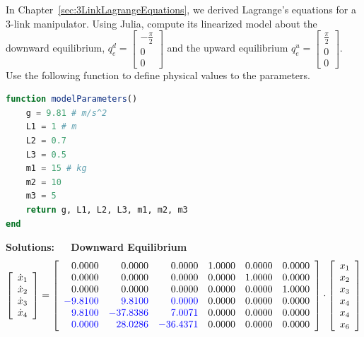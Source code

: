     \bigskip

\begin{example}
\label{ex:linearizedModel3LinkManipulator}
    
    In Chapter~\ref{sec:3LinkLagrangeEquations}, we derived Lagrange's equations for a 3-link manipulator. Using Julia, compute its linearized model about the downward equilibrium, $q_e^{d}=\left[ \begin{array}{c} -\frac{\pi}{2}\\ 0 \\0\end{array} \right]$ and the upward equilibrium $q_e^{u}=\left[ \begin{array}{c} \frac{\pi}{2}\\ 0 \\0\end{array} \right]$. \\

    Use the following function to define physical values to the parameters.
\begin{lstlisting}[language=Julia,style=mystyle]
function modelParameters()
    g = 9.81 # m/s^2
    L1 = 1 # m
    L2 = 0.7
    L3 = 0.5
    m1 = 15 # kg
    m2 = 10
    m3 = 5    
    return g, L1, L2, L3, m1, m2, m3
end
\end{lstlisting}

    \end{example}
    \textbf{Solutions:} ~~ \newline
    \Ans \quad \textbf{Downward Equilibrium}
 $$\left[ \begin{array}{c} \dot{x}_1\\ \dot{x}_2 \\ \dot{x}_3 \\ \dot{x}_4 \end{array} \right]
 = \left[ \begin{array}{rrrrrr}
0.0000 & 0.0000 & 0.0000 & 1.0000 & 0.0000 & 0.0000 \\
0.0000 & 0.0000 & 0.0000 & 0.0000 & 1.0000 & 0.0000 \\
0.0000 & 0.0000 & 0.0000 & 0.0000 & 0.0000 & 1.0000 \\
\color{blue} -9.8100 & \color{blue} 9.8100 & \color{blue} 0.0000 & 0.0000 & 0.0000 & 0.0000 \\
\color{blue} 9.8100 & \color{blue} -37.8386 & \color{blue} 7.0071 & 0.0000 & 0.0000 & 0.0000 \\
\color{blue} 0.0000 & \color{blue} 28.0286 & \color{blue} -36.4371 & 0.0000 & 0.0000 & 0.0000 \\
\end{array} \right] \cdot \left[ \begin{array}{c} x_1\\ x_2 \\ x_3 \\x_4 \\ x_4 \\ x_6\end{array} \right]
$$
